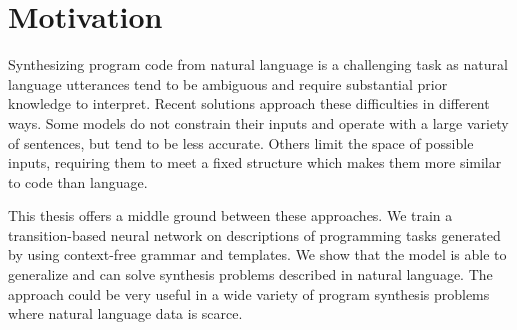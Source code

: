 \section{Motivation}
Synthesizing program code from natural language is a challenging task as natural
language utterances tend to be ambiguous and require substantial prior knowledge
to interpret. Recent solutions approach these difficulties in different ways. Some models do not
constrain their inputs and operate with a large variety of sentences, but tend
to be less accurate. Others limit the space of possible inputs, requiring them
to meet a fixed structure which makes them more similar to code than language.

This thesis offers a middle ground between these approaches. We train a
transition-based neural network on descriptions of programming tasks generated by
using context-free grammar and templates. We show that the model is able to
generalize and can solve synthesis problems described in natural language.
The approach could be very useful in a wide variety of program synthesis problems where natural language data is scarce.